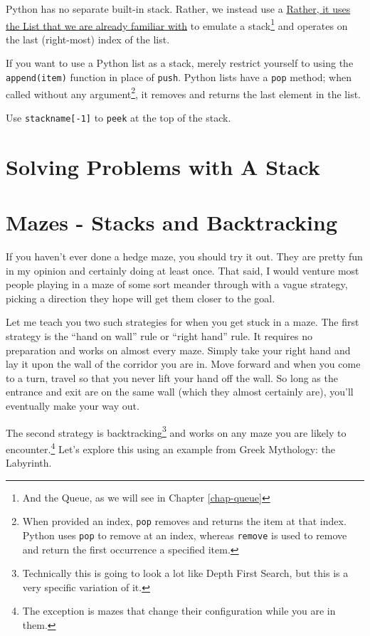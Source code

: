 Python has no separate built-in stack. Rather, we instead use a  \href{https://docs.python.org/3/tutorial/datastructures.html#using-lists-as-stacks} {Rather, it uses the List that we are already familiar with} to emulate a stack\footnote{And the Queue, as we will see in Chapter \ref{chap-queue}} and operates on the last (right-most) index of the list.

If you want to use a Python list as a stack, merely restrict yourself to using the \texttt{append(item)} function in place of \texttt{push}.  Python lists have a \texttt{pop} method;  when called without any argument\footnote{When provided an index, \texttt{pop} removes and returns the item at that index.  Python uses \texttt{pop} to remove at an index, whereas \texttt{remove} is used to remove and return the first occurrence a specified item.},  it removes and returns the last element in the list.

Use \texttt{stackname[-1]} to \texttt{peek} at the top of the stack.




\section{Solving Problems with A Stack}


\section{Mazes - Stacks and Backtracking}

If you haven't ever done a hedge maze, you should try it out.  They are pretty fun in my opinion and certainly doing at least once.  That said, I would venture most people playing in a maze of some sort meander through with a vague strategy, picking a direction they hope will get them closer to the goal.

Let me teach you two such strategies for when you get stuck in a maze.  The first strategy is the ``hand on wall'' rule or ``right hand'' rule.  It requires no preparation and works on almost every maze.  Simply take your right hand and lay it upon the wall of the corridor you are in.  Move forward and when you come to a turn, travel so that you never lift your hand off the wall.  So long as the entrance and exit are on the same wall (which they almost certainly are), you'll eventually make your way out.

The second strategy is backtracking\footnote{Technically this is going to look a lot like Depth First Search, but this is a very specific variation of it.} and works on any maze you are likely to encounter.\footnote{The exception is mazes that change their configuration while you are in them.}  Let's explore this using an example from Greek Mythology: the Labyrinth. 

